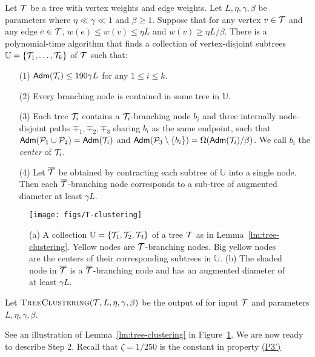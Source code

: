\begin{lemma}\label{lm:tree-clustering} Let $\mathcal{T}$ be a tree with vertex weights and edge weights. Let $L, \eta, \gamma,\beta$  be parameters where $\eta \ll \gamma \ll 1$ and $\beta\geq 1$. Suppose that for any vertex $v\in \mathcal{T}$ and any edge $e\in \mathcal{T}$, $w(e) \leq w(v) \leq \eta L$ and $w(v)\geq \eta L/\beta$. There is a polynomial-time algorithm that finds a collection of vertex-disjoint subtrees $\mathbb{U} = \{\mathcal{T}_1,\ldots, \mathcal{T}_k\}$ of $\mathcal{T}$ such that:
	\begin{enumerate}[noitemsep]
		\item[(1)] $\mathsf{Adm}(\mathcal{T}_i) \leq 190\gamma L$ for any $1\leq i \leq k$.
		\item[(2)] Every branching node is contained in some tree in $\mathbb{U}$. 
		\item[(3)] Each tree $\mathcal{T}_i$ contains a $\mathcal{T}_i$-branching node $b_i$ and three internally node-disjoint paths $\mp_1,\mp_2, \mp_3$ sharing $b_i$ as the same endpoint, such that $\mathsf{Adm}(\mathcal{P}_1\cup \mathcal{P}_2) = \mathsf{Adm}(\mathcal{T}_i)$ and $\mathsf{Adm}(\mathcal{P}_3 \setminus \{b_i\})= \Omega(\mathsf{Adm}(\mathcal{T}_i)/\beta)$. We call $b_i$ the \emph{center} of $\mathcal{T}_i$.
		\item[(4)] Let $\overline{\mathcal{T}}$ be obtained by contracting each subtree of $\mathbb{U}$ into a single node. Then each $\overline{\mathcal{T}}$-branching node corresponds to a sub-tree  of augmented diameter at least $\gamma L$.
	\end{enumerate}
\end{lemma}



\begin{figure}[!h]
	\begin{center}
		\texttt{[image: figs/T-clustering]}
	\end{center}
	\caption{(a) A collection $\mathbb{U} = \{\mathcal{T}_1,\mathcal{T}_2,\mathcal{T}_3\}$ of a tree $\mathcal{T}$ as in Lemma~\ref{lm:tree-clustering}. Yellow nodes are $\mathcal{T}$-branching nodes. Big yellow nodes are the centers of their corresponding subtrees in $\mathbb{U}$. (b)  The shaded node in $\overline{\mathcal{T}}$ is a $\overline{\mathcal{T}}$-branching node and has an augmented diameter of at least $\gamma L$.}
	\label{fig:T-clustering}
\end{figure}


Let $\textsc{TreeClustering}(\mathcal{T},L,\eta,\gamma,\beta)$ be the output of  for input $\mathcal{T}$ and parameters $L,\eta,\gamma,\beta$. 

\noindent See an illustration of Lemma~\ref{lm:tree-clustering}  in Figure~\ref{fig:T-clustering}. We are now ready to describe Step 2. Recall that $\zeta = 1/250$ is the constant in property \hyperlink{P3'}{(P3')}

